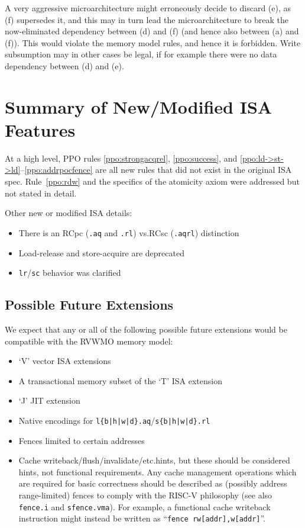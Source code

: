 A very aggressive microarchitecture might erroneously decide to discard (e), as (f) supersedes it, and this may in turn lead the microarchitecture to break the now-eliminated dependency between (d) and (f) (and hence also between (a) and (f)).
This would violate the memory model rules, and hence it is forbidden.
Write subsumption may in other cases be legal, if for example there were no data dependency between (d) and (e).

\section{Summary of New/Modified ISA Features}

At a high level, PPO rules \ref{ppo:strongacqrel}, \ref{ppo:success}, and \ref{ppo:ld->st->ld}--\ref{ppo:addrpocfence} are all new rules that did not exist in the original ISA spec.  Rule~\ref{ppo:rdw} and the specifics of the atomicity axiom were addressed but not stated in detail.

Other new or modified ISA details:
\begin{itemize}
  \item There is an RCpc ({\tt .aq} and {\tt .rl}) vs.\@ RCsc ({\tt .aqrl}) distinction
  \item Load-release and store-acquire are deprecated
  \item {\tt lr}/{\tt sc} behavior was clarified
\end{itemize}

\subsection{Possible Future Extensions}

We expect that any or all of the following possible future extensions would be compatible with the RVWMO memory model:

\begin{itemize}
  \item `V' vector ISA extensions
  \item A transactional memory subset of the `T' ISA extension
  \item `J' JIT extension
  \item Native encodings for {\tt l\{b|h|w|d\}.aq}/{\tt s\{b|h|w|d\}.rl}
  \item Fences limited to certain addresses
  \item Cache writeback/flush/invalidate/etc.\@ hints, but these should be considered hints, not functional requirements.  Any cache management operations which are required for basic correctness should be described as (possibly address range-limited) fences to comply with the RISC-V philosophy (see also {\tt fence.i} and {\tt sfence.vma}).  For example, a functional cache writeback instruction might instead be written as ``{\tt fence~rw[addr],w[addr]}''.
\end{itemize}

